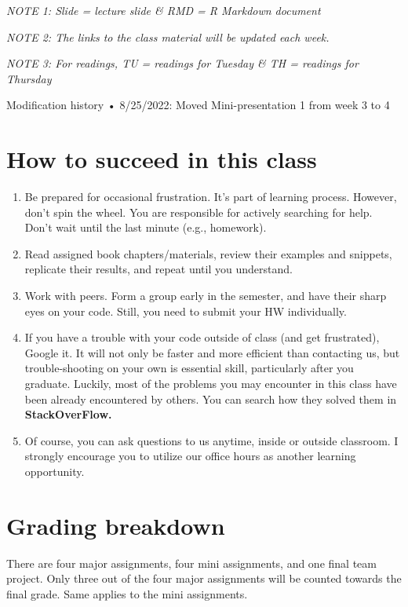 \documentclass[
]{article}
\providecommand{\tightlist}{%
  \setlength{\itemsep}{0pt}\setlength{\parskip}{0pt}}
\begin{document}
\emph{NOTE 1: Slide = lecture slide \& RMD = R Markdown document}

\emph{NOTE 2: The links to the class material will be updated each
week.}

\emph{NOTE 3: For readings, TU = readings for Tuesday \& TH = readings
for Thursday}

Modification history • 8/25/2022: Moved Mini-presentation 1 from week 3
to 4

\hypertarget{how-to-succeed-in-this-class}{%
\section{How to succeed in this
class}\label{how-to-succeed-in-this-class}}

\begin{enumerate}
\def\labelenumi{\arabic{enumi}.}
\tightlist
\item
  Be prepared for occasional frustration. It's part of learning process.
  However, don't spin the wheel. You are responsible for actively
  searching for help. Don't wait until the last minute (e.g., homework).
\item
  Read assigned book chapters/materials, review their examples and
  snippets, replicate their results, and repeat until you understand.
\item
  Work with peers. Form a group early in the semester, and have their
  sharp eyes on your code. Still, you need to submit your HW
  individually.
\item
  If you have a trouble with your code outside of class (and get
  frustrated), Google it. It will not only be faster and more efficient
  than contacting us, but trouble-shooting on your own is essential
  skill, particularly after you graduate. Luckily, most of the problems
  you may encounter in this class have been already encountered by
  others. You can search how they solved them in \textbf{StackOverFlow.}
\item
  Of course, you can ask questions to us anytime, inside or outside
  classroom. I strongly encourage you to utilize our office hours as
  another learning opportunity.
\end{enumerate}

\hypertarget{grading-breakdown}{%
\section{Grading breakdown}\label{grading-breakdown}}

There are four major assignments, four mini assignments, and one final
team project. Only three out of the four major assignments will be
counted towards the final grade. Same applies to the mini assignments.
\end{document}

